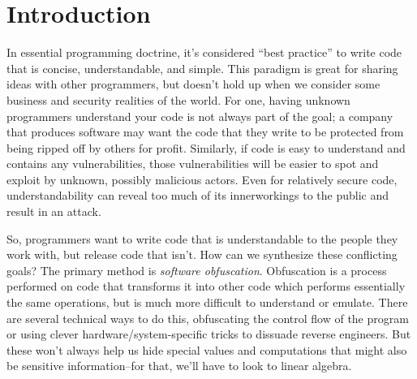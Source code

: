 \section{Introduction}
In essential programming doctrine, it's considered ``best practice'' to write code that
is concise, understandable, and simple. This paradigm is great for sharing ideas
with other programmers, but doesn't hold up when we consider some business and 
security realities of the world. For one, having unknown programmers understand
your code is not always part of the goal; a company that produces software may
want the code that they write to be protected from being ripped off by others
for profit. Similarly, if code is easy to understand and contains any vulnerabilities, 
those vulnerabilities will be easier to spot and exploit by unknown, possibly
malicious actors. Even for relatively secure code, understandability can reveal
too much of its innerworkings to the public and result in an attack.
\par So, programmers want to write code that is understandable to the people 
they work with, but release code that isn't. How can we synthesize 
these conflicting goals? The primary method is {\itshape software obfuscation}.
Obfuscation is a process performed on code that transforms it into other code
which performs essentially the same operations, but is much more difficult to 
understand or emulate. There are several technical ways to do this, obfuscating
the control flow of the program or using clever hardware/system-specific tricks
to dissuade reverse engineers. But these won't always help us hide special values
and computations that might also be sensitive information--for that, we'll have to 
look to linear algebra.
